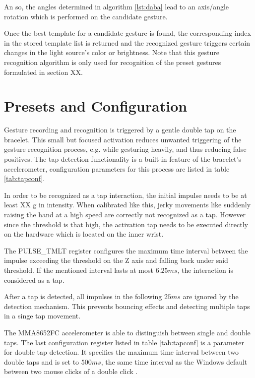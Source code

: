 An so, the angles determined in algorithm \ref{lst:daba} lead to an axis/angle rotation which is performed on the candidate gesture.

Once the best template for a candidate gesture is found, the corresponding index in the stored template list is returned and the recognized gesture triggers certain changes in the light source's color or brightness. Note that this gesture recognition algorithm is only used for recognition of the preset gestures formulated in section XX. %


\section{Presets and Configuration}
\label{sec:config}
Gesture recording and recognition is triggered by a gentle double tap on the bracelet. This small but focused activation reduces unwanted triggering of the gesture recognition process, e.g. while gesturing heavily, and thus reducing false positives. The tap detection functionality is a built-in feature of the bracelet's accelerometer, configuration parameters for this process are listed in table \ref{tab:tapconf}.

In order to be recognized as a tap interaction, the initial impulse needs to be at least XX g in intensity. When calibrated like this, jerky movements like suddenly raising the hand at a high speed are correctly not recognized as a tap. However since the threshold is that high, the activation tap needs to be executed directly on the hardware which is located on the inner wrist.

The PULSE\_TMLT register configures the maximum time interval between the  impulse exceeding the threshold on the Z axis and falling back under said threshold. If the mentioned interval lasts at most $6.25 ms$, the interaction is considered as a tap.

After a tap is detected, all impulses in the following $25ms$ are ignored by the detection mechanism. This prevents bouncing effects and detecting multiple taps in a singe tap movement.

The MMA8652FC accelerometer is able to distinguish between single and double taps. The last configuration register listed in table \ref{tab:tapconf} is a parameter for double tap detection. It specifies the maximum time interval between two double taps and is set to $500 ms$, the same time interval as the Windows default between two mouse clicks of a double click \cite{doubleclick}.

